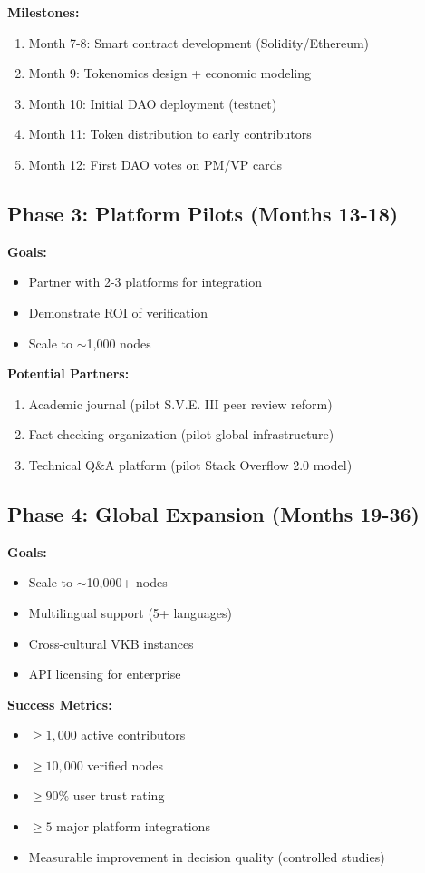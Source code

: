 \documentclass[11pt,a4paper]{article}
\theoremstyle{definition}
\theoremstyle{remark}
\newcommand{\VKB}{\textsc{VKB}}
\newcommand{\DAO}{\textsc{DAO}}
\begin{document}
\textbf{Milestones:}
\begin{enumerate}
    \item Month 7-8: Smart contract development (Solidity/Ethereum)
    \item Month 9: Tokenomics design + economic modeling
    \item Month 10: Initial \DAO{} deployment (testnet)
    \item Month 11: Token distribution to early contributors
    \item Month 12: First \DAO{} votes on PM/VP cards
\end{enumerate}

\subsection{Phase 3: Platform Pilots (Months 13-18)}

\textbf{Goals:}
\begin{itemize}
    \item Partner with 2-3 platforms for integration
    \item Demonstrate ROI of verification
    \item Scale to $\sim$1,000 nodes
\end{itemize}

\textbf{Potential Partners:}
\begin{enumerate}
    \item Academic journal (pilot S.V.E. III peer review reform)
    \item Fact-checking organization (pilot global infrastructure)
    \item Technical Q\&A platform (pilot Stack Overflow 2.0 model)
\end{enumerate}

\subsection{Phase 4: Global Expansion (Months 19-36)}

\textbf{Goals:}
\begin{itemize}
    \item Scale to $\sim$10,000+ nodes
    \item Multilingual support (5+ languages)
    \item Cross-cultural \VKB{} instances
    \item API licensing for enterprise
\end{itemize}

\textbf{Success Metrics:}
\begin{itemize}
    \item $\geq 1,000$ active contributors
    \item $\geq 10,000$ verified nodes
    \item $\geq 90\%$ user trust rating
    \item $\geq 5$ major platform integrations
    \item Measurable improvement in decision quality (controlled studies)
\end{itemize}

\end{document}
